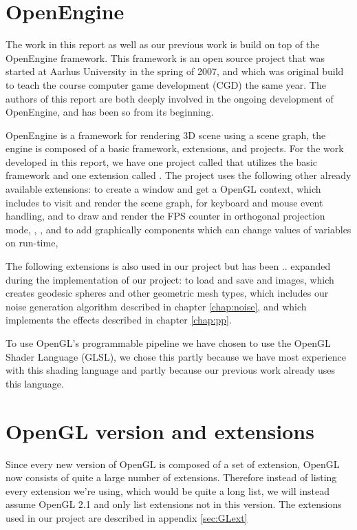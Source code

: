 \section{OpenEngine}
The work in this report as well as our previous work is build on top
of the OpenEngine framework. This framework is an open source project
that was started at Aarhus University in the spring of 2007, and which
was original build to teach the course computer game development (CGD)
the same year. The authors of this report are both deeply involved in
the ongoing development of OpenEngine, and has been so from its
beginning.

OpenEngine is a framework for rendering 3D scene using a scene graph,
the engine is composed of a basic framework, extensions, and
projects. For the work developed in this report, we have one project
called  that utilizes the basic framework and one extension 
called . The  project
uses the following other already available extensions: 
 to create a window and get a OpenGL context,
 which includes  to visit and render
the scene graph,
 for keyboard and mouse event handling, 
 and  to draw and render the FPS counter
in orthogonal projection mode,
, , and  to add
graphically components which can change values of variables on run-time,

The following extensions is also used in our project but has been
.. expanded during the implementation of our project:
 to load and save  and  images, 
 which creates geodesic spheres and other geometric
mesh types, 
 which includes our noise generation algorithm
described in chapter \ref{chap:noise},
and  which implements the effects
described in chapter \ref{chap:pp}.


To use OpenGL's programmable pipeline we have chosen to use the
OpenGL Shader Language (GLSL), we chose this partly because we have
most experience with this shading language and partly because our
previous work already uses this language.

\section{OpenGL version and extensions}

Since every new version of OpenGL is composed of a set of extension,
OpenGL now consists of quite a large number of extensions. Therefore
instead of listing every extension we're using, which would be quite a
long list, we will instead assume OpenGL 2.1 and only list extensions
not in this version. The extensions used in our project are described
in appendix \ref{sec:GLext}

